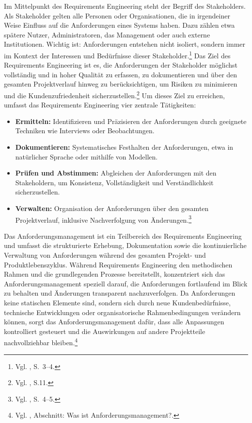 \documentclass[
    12pt, 
    a4paper,
    ]{scrartcl} %
\begin{document}
Im Mittelpunkt des Requirements Engineering steht der Begriff des Stakeholders. Als Stakeholder gelten alle Personen oder Organisationen, die in irgendeiner Weise Einfluss auf die Anforderungen eines Systems haben. Dazu zählen etwa spätere Nutzer, Administratoren, das Management oder auch externe Institutionen. Wichtig ist: Anforderungen entstehen nicht isoliert, sondern immer im Kontext der Interessen und Bedürfnisse dieser Stakeholder.\footnote{Vgl. \cite{S_PohlRupp}, S.~3--4.}
Das Ziel des Requirements Engineering ist es, die Anforderungen der Stakeholder möglichst vollständig und in hoher Qualität zu erfassen, zu dokumentieren und über den gesamten Projektverlauf hinweg zu berücksichtigen, um Risiken zu minimieren und die Kundenzufriedenheit sicherzustellen.\footnote{Vgl. \cite{S_PohlRupp}, S.11.}
Um dieses Ziel zu erreichen, umfasst das Requirements Engineering vier zentrale Tätigkeiten:
\begin{itemize}
    \item \textbf{Ermitteln:} Identifizieren und Präzisieren der Anforderungen durch geeignete Techniken wie Interviews oder Beobachtungen.
    \item \textbf{Dokumentieren:} Systematisches Festhalten der Anforderungen, etwa in natürlicher Sprache oder mithilfe von Modellen.
    \item \textbf{Prüfen und Abstimmen:} Abgleichen der Anforderungen mit den Stakeholdern, um Konsistenz, Vollständigkeit und Verständlichkeit sicherzustellen.
    \item \textbf{Verwalten:} Organisation der Anforderungen über den gesamten Projektverlauf, inklusive Nachverfolgung von Änderungen.\footnote{Vgl. \cite{S_PohlRupp}, S.~4--5.}
\end{itemize}
Das Anforderungsmanagement ist ein Teilbereich des Requirements Engineering und umfasst die strukturierte Erhebung, Dokumentation sowie die kontinuierliche Verwaltung von Anforderungen während des gesamten Projekt- und Produktlebenszyklus. Während Requirements Engineering den methodischen Rahmen und die grundlegenden Prozesse bereitstellt, konzentriert sich das Anforderungsmanagement speziell darauf, die Anforderungen fortlaufend im Blick zu behalten und Änderungen transparent nachzuverfolgen. Da Anforderungen keine statischen Elemente sind, sondern sich durch neue Kundenbedürfnisse, technische Entwicklungen oder organisatorische Rahmenbedingungen verändern können, sorgt das Anforderungsmanagement dafür, dass alle Anpassungen kontrolliert gesteuert und die Auswirkungen auf andere Projektteile nachvollziehbar bleiben.\footnote{Vgl. \cite{S_PMTools}, Abschnitt: Was ist Anforderungsmanagement?.}
\end{document}
